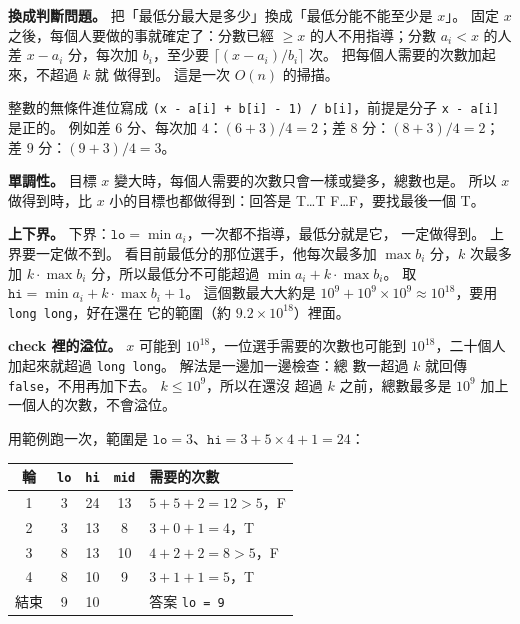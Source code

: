 \textbf{換成判斷問題。} 把「最低分最大是多少」換成「最低分能不能至少是 $x$」。
固定 $x$ 之後，每個人要做的事就確定了：分數已經 $\ge x$ 的人不用指導；分數
$a_i < x$ 的人差 $x - a_i$ 分，每次加 $b_i$，至少要
$\lceil (x - a_i) / b_i \rceil$ 次。 把每個人需要的次數加起來，不超過 $k$ 就
做得到。 這是一次 $O(n)$ 的掃描。

整數的無條件進位寫成 \texttt{(x - a[i] + b[i] - 1) / b[i]}，前提是分子
\texttt{x - a[i]} 是正的。 例如差 $6$ 分、每次加 $4$：$(6 + 3) / 4 = 2$；差
$8$ 分：$(8 + 3) / 4 = 2$；差 $9$ 分：$(9 + 3) / 4 = 3$。

\textbf{單調性。} 目標 $x$ 變大時，每個人需要的次數只會一樣或變多，總數也是。
所以 $x$ 做得到時，比 $x$ 小的目標也都做得到：回答是 T…T F…F，要找最後一個 T。

\textbf{上下界。} 下界：$\texttt{lo} = \min a_i$，一次都不指導，最低分就是它，
一定做得到。 上界要一定做不到。 看目前最低分的那位選手，他每次最多加
$\max b_i$ 分，$k$ 次最多加 $k \cdot \max b_i$ 分，所以最低分不可能超過
$\min a_i + k \cdot \max b_i$。 取
$\texttt{hi} = \min a_i + k \cdot \max b_i + 1$。 這個數最大大約是
$10^9 + 10^9 \times 10^9 \approx 10^{18}$，要用 \texttt{long long}，好在還在
它的範圍（約 $9.2 \times 10^{18}$）裡面。

\textbf{check 裡的溢位。} $x$ 可能到 $10^{18}$，一位選手需要的次數也可能到
$10^{18}$，二十個人加起來就超過 \texttt{long long}。 解法是一邊加一邊檢查：總
數一超過 $k$ 就回傳 \texttt{false}，不用再加下去。 $k \le 10^9$，所以在還沒
超過 $k$ 之前，總數最多是 $10^9$ 加上一個人的次數，不會溢位。

用範例跑一次，範圍是 $\texttt{lo} = 3$、$\texttt{hi} = 3 + 5 \times 4 + 1 = 24$：

\begin{center}
\begin{tabular}{ccccl}
\toprule
輪 & \texttt{lo} & \texttt{hi} & \texttt{mid} & 需要的次數 \\
\midrule
1 & 3 & 24 & 13 & $5 + 5 + 2 = 12 > 5$，F \\
2 & 3 & 13 & 8 & $3 + 0 + 1 = 4$，T \\
3 & 8 & 13 & 10 & $4 + 2 + 2 = 8 > 5$，F \\
4 & 8 & 10 & 9 & $3 + 1 + 1 = 5$，T \\
\midrule
結束 & 9 & 10 & & 答案 \texttt{lo = 9} \\
\bottomrule
\end{tabular}
\end{center}

\begin{center}
\label{fig:coach-tf}
\end{center}

